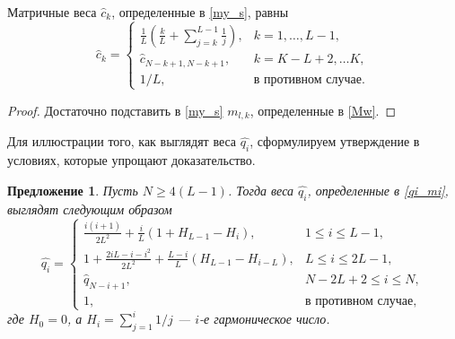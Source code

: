 \documentclass[12pt,a4paper,fleqn,leqno]{article}
\newtheorem{proposition}{Предложение}%
\begin{document}
\begin{lemma} \label{myweightstat}
Матричные веса $\hat c_k$, определенные в \eqref{my_s}, равны
\begin{equation*}
\hat c_k = \begin{cases}
\frac{1}{L}\left(\frac{k}{L} + \sum_{j=k}^{L-1} \frac{1}{j} \right),& k = 1, \ldots, L-1, \\
\hat c_{N - k + 1, N - k + 1}, & k = K - L + 2, \ldots K, \\
1/L, &\text{в противном случае}.
\end{cases}
\end{equation*}
\end{lemma}

\begin{proof}
Достаточно подставить в \eqref{my_s} $m_{l,k}$, определенные в \eqref{Mw}.
\end{proof}

Для иллюстрации того, как выглядят веса $\hat{q_i}$, сформулируем утверждение в условиях, которые упрощают доказательство.

\begin{proposition} \label{myserweightstat}
Пусть $N \ge 4(L-1)$. Тогда веса $\hat{q_i}$, определенные в \eqref{qi_mi},
выглядят следующим образом
\begin{equation*}
\hat{q_i} = \begin{cases}
\frac{i(i+1)}{2 L^2} + \frac{i}{L}(1 + H_{L-1} - H_i), &1 \le i \le L-1, \\
1 + \frac{2iL-i-i^2}{2L^2} + \frac{L-i}{L}(H_{L-1} - H_{i - L}), & L \le i \le 2L-1, \\
\hat{q}_{N-i+1}, &N-2L+2 \le i \le N, \\
1, &\text{в противном случае},
\end{cases}
\end{equation*}
где $H_0 = 0$, а $H_i = \sum_{j=1}^i 1/j$ --- $i$-е гармоническое число.
\end{proposition}
\end{document}
